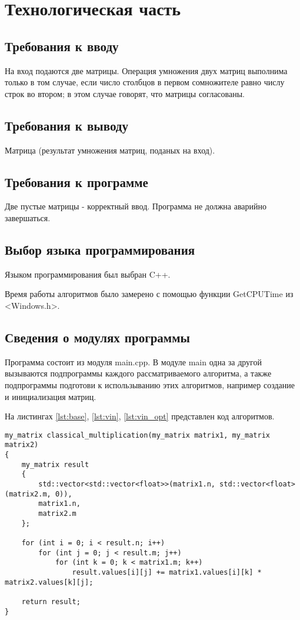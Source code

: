 \section{Технологическая часть}

\subsection{Требования к вводу}
На вход подаются две матрицы. Операция умножения двух матриц выполнима только в том случае, если число столбцов в первом сомножителе равно числу строк во втором; в этом случае говорят, что матрицы согласованы.

\subsection{Требования к выводу}
Матрица (результат умножения матриц, поданых на вход).

\subsection{Требования к программе}
Две пустые матрицы - корректный ввод. Программа не должна аварийно завершаться.

\subsection{Выбор языка программирования}
Языком программирования был выбран C++.

Время работы алгоритмов было замерено с помощью функции GetCPUTime из <Windows.h>.

\subsection{Сведения о модулях программы}
Программа состоит из модуля main.cpp. В модуле main одна за другой вызываются подпрограммы каждого рассматриваемого алгоритма, а также подпрограммы подготови к использыванию этих алгоритмов, например создание и инициализация матриц.

На листингах \ref{lst:base}, \ref{lst:vin}, \ref{lst:vin_opt} представлен код алгоритмов.
\begin{lstlisting}[label=lst:base,caption=Классический алгоритм умножения матриц]
my_matrix classical_multiplication(my_matrix matrix1, my_matrix matrix2)
{
	my_matrix result
	{
		std::vector<std::vector<float>>(matrix1.n, std::vector<float>(matrix2.m, 0)),
		matrix1.n,
		matrix2.m
	};

	for (int i = 0; i < result.n; i++)
		for (int j = 0; j < result.m; j++)
			for (int k = 0; k < matrix1.m; k++)
				result.values[i][j] += matrix1.values[i][k] * matrix2.values[k][j];

	return result;
}
 \end{lstlisting}
 
